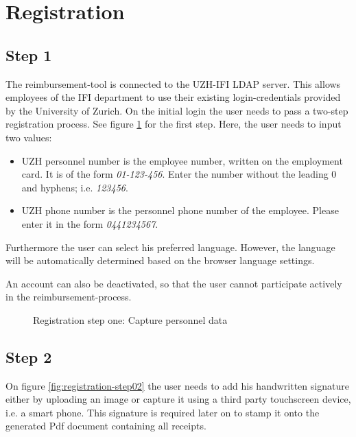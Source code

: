 \section*{Registration}
\label{sec:registration}

\subsection*{Step 1}
The reimbursement-tool is connected to the UZH-IFI LDAP server. This allows employees of the IFI department to use their existing login-credentials provided by the University of Zurich.\newline
On the initial login the user needs to pass a two-step registration process. See figure \ref{fig:registration-step01} for the first step. Here, the user needs to input two values:
\begin{itemize}
    \item UZH personnel number is the employee number, written on the employment card. It is of the form \textit{01-123-456}. Enter the number without the leading 0 and hyphens; i.e. \textit{123456}.
    \item UZH phone number is the personnel phone number of the employee. Please enter it in the form \textit{0441234567}.
\end{itemize}\newpage

Furthermore the user can select his preferred language. However, the language will be automatically determined based on the browser language settings.\par
An account can also be deactivated, so that the user cannot participate actively in the reimbursement-process.

\begin{figure}[H]
    \centering
    \caption{Registration step one: Capture personnel data}
    \label{fig:registration-step01}
\end{figure}

\subsection*{Step 2}
On figure \ref{fig:registration-step02} the user needs to add his handwritten signature either by uploading an image or capture it using a third party touchscreen device, i.e. a smart phone. This signature is required later on to stamp it onto the generated Pdf document containing all receipts.

